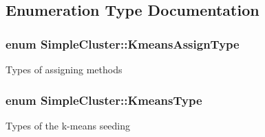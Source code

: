 \subsection{Enumeration Type Documentation}
\hypertarget{namespaceSimpleCluster_a1ad2d6129171ff9a5ee57f48b5f3f6e1}{
\subsubsection[{Kmeans\+Assign\+Type}]{\setlength{\rightskip}{0pt plus 5cm}enum {\bf Simple\+Cluster\+::\+Kmeans\+Assign\+Type}\hspace{0.3cm}{\ttfamily [strong]}}}\label{namespaceSimpleCluster_a1ad2d6129171ff9a5ee57f48b5f3f6e1}
Types of assigning methods \hypertarget{namespaceSimpleCluster_a8a8f57121b69a7b43575e4d6a53928e2}{
\subsubsection[{Kmeans\+Type}]{\setlength{\rightskip}{0pt plus 5cm}enum {\bf Simple\+Cluster\+::\+Kmeans\+Type}\hspace{0.3cm}{\ttfamily [strong]}}}\label{namespaceSimpleCluster_a8a8f57121b69a7b43575e4d6a53928e2}
Types of the k-\/means seeding 

